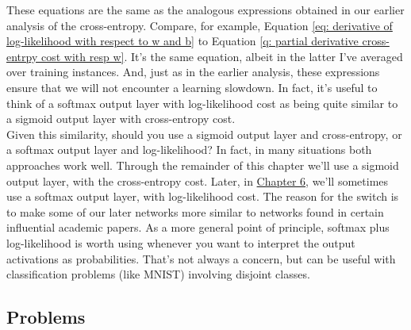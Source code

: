 \documentclass[a4paper,11pt,twoside]{report}
\begin{document}
These equations are the same as the analogous expressions obtained in our earlier analysis of the cross-entropy. Compare, for example, Equation \ref{eq: derivative of log-likelihood with respect to w and b} to Equation \ref{q: partial derivative cross-entrpy cost with resp w}. It's the same equation, albeit in the latter I've averaged over training instances. And, just as in the earlier analysis, these expressions ensure that we will not encounter a learning slowdown. In fact, it's useful to think of a softmax output layer with log-likelihood cost as being quite similar to a sigmoid output layer with cross-entropy cost.\\

Given this similarity, should you use a sigmoid output layer and cross-entropy, or a softmax output layer and log-likelihood? In fact, in many situations both approaches work well. Through the remainder of this chapter we'll use a sigmoid output layer, with the cross-entropy cost. Later, in \hyperref[chap: Deep learning]{Chapter 6}, we'll sometimes use a softmax output layer, with log-likelihood cost. The reason for the switch is to make some of our later networks more similar to networks found in certain influential academic papers. As a more general point of principle, softmax plus log-likelihood is worth using whenever you want to interpret the output activations as probabilities. That's not always a concern, but can be useful with classification problems (like MNIST) involving disjoint classes.

\subsection*{Problems}
\label{Problems: softmax name and backpropagation}
\end{document}
